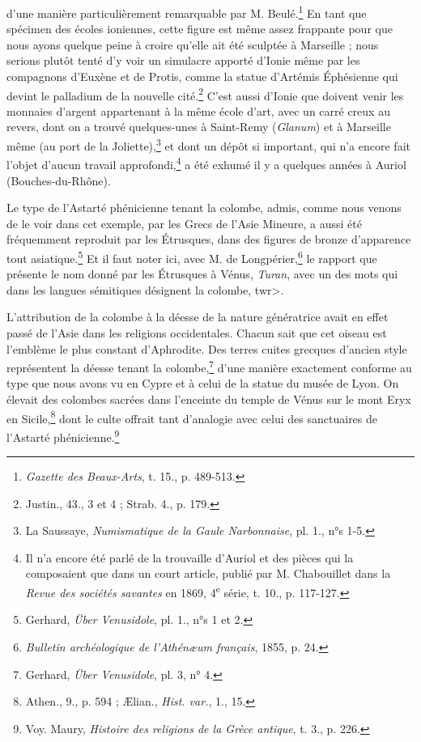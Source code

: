 \documentclass[a4paper, 11pt, oneside, landscape]{article}
\begin{document}
d'une manière particulièrement remarquable par M. Beulé.\footnote{\emph{Gazette des Beaux-Arts}, t. 15., p. 489-513.} En tant que spécimen des écoles ioniennes, cette figure est même assez frappante pour que nous ayons quelque peine à croire qu'elle ait été sculptée à Marseille ; nous serions plutôt tenté d'y voir un simulacre apporté d'Ionie même par les compagnons d'Euxène et de Protis, comme la statue d'Artémis Éphésienne qui devint le palladium de la nouvelle cité.\footnote{Justin., 43., 3 et 4 ; Strab. 4., p. 179.} C'est aussi d'Ionie que doivent venir les monnaies d'argent appartenant à la même école d'art, avec un carré creux au revers, dont on a trouvé quelques-unes à Saint-Remy (\emph{Glanum}) et à Marseille même (au port de la Joliette),\footnote{La Saussaye, \emph{Numismatique de la Gaule Narbonnaise}, pl. 1., n°s 1-5.} et dont un dépôt si important, qui n'a encore fait l'objet d'aucun travail approfondi,\footnote{Il n'a encore été parlé de la trouvaille d'Auriol et des pièces qui la composaient que dans un court article, publié par M. Chabouillet dans la \emph{Revue des sociétés savantes} en 1869, 4\textsuperscript{e} série, t. 10., p. 117-127.} a été exhumé il y a quelques années à Auriol (Bouches-du-Rhône).

Le type de l'Astarté phénicienne tenant la colombe, admis, comme nous venons de le voir dans cet exemple, par les Grecs de l'Asie Mineure, a aussi été fréquemment reproduit par les Étrusques, dans des figures de bronze d'apparence tout asiatique.\footnote{Gerhard, \emph{Über Venusidole}, pl. 1., n°s 1 et 2.} Et il faut noter ici, avec M. de Longpérier,\footnote{\emph{Bulletin archéologique de l'Athénæum français}, 1855, p. 24.} le rapport que présente le nom donné par les Étrusques à Vénus, \emph{Turan}, avec un des mots qui dans les langues sémitiques désignent la colombe, \<twr>.

L'attribution de la colombe à la déesse de la nature génératrice avait en effet passé de l'Asie dans les religions occidentales. Chacun sait que cet oiseau est l'emblème le plus constant d'Aphrodite. Des terres cuites grecques d'ancien style représentent la déesse tenant la colombe,\footnote{Gerhard, \emph{Über Venusidole}, pl. 3, n° 4.} d'une manière exactement conforme au type que nous avons vu en Cypre et à celui de la statue du musée de Lyon. On élevait des colombes sacrées dans l'enceinte du temple de Vénus sur le mont Eryx en Sicile,\footnote{Athen., 9., p. 594 ; Ælian., \emph{Hist. var.}, 1., 15.} dont le culte offrait tant d'analogie avec celui des sanctuaires de l'Astarté phénicienne.\footnote{Voy. Maury, \emph{Histoire des religions de la Grèce antique}, t. 3., p. 226.}
\end{document}
